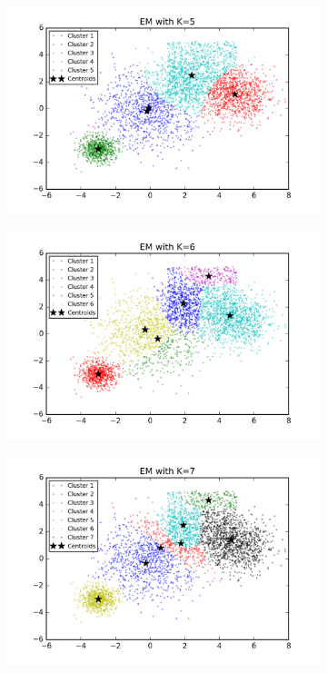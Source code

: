 \begin{figure}[htb]
\begin{subfigure}[b]{0.475\textwidth}
            \includegraphics[width=\textwidth]{./figures/bigClustering_EM_5.png}
        \end{subfigure}
        \hfill
        \begin{subfigure}[b]{0.475\textwidth}   
            \centering 
            \includegraphics[width=\textwidth]{./figures/bigClustering_EM_6.png}
        \end{subfigure}
        \begin{subfigure}[b]{0.475\textwidth}   
            \centering 
            \includegraphics[width=\textwidth]{./figures/bigClustering_EM_7.png}

\end{subfigure}
\end{figure}
